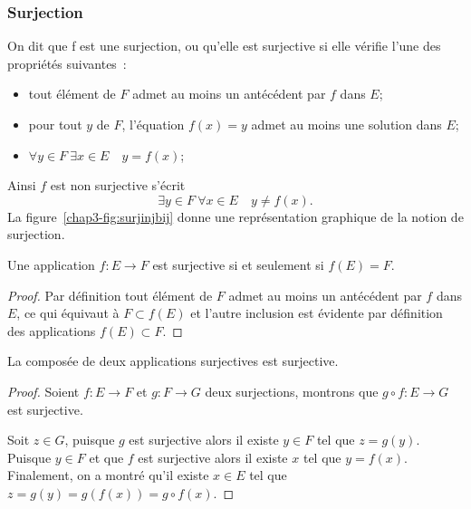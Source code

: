 \subsubsection{Surjection}
\label{chap3-subsubsec:surjection}
\begin{defdef}
  On dit que f est une surjection, ou qu'elle est surjective si elle vérifie l'une des propriétés suivantes~:
  \begin{itemize}
  \item tout élément de $F$ admet au moins un antécédent par $f$ dans $E$;
  \item pour tout $y$ de $F$, l'équation $f(x)=y$ admet au moins une solution dans $E$;
  \item $\forall y \in F \ \exists x \in E \quad y=f(x)$;
  \end{itemize}
  Ainsi $f$ est non surjective s'écrit
  \begin{equation}
    \exists y \in F \ \forall x \in E \quad y \neq f(x).
  \end{equation}
  La figure~\ref{chap3-fig:surjinjbij} donne une représentation graphique de la notion de surjection.
\end{defdef}
\begin{prop}
  Une application $f:E \longrightarrow F$ est surjective si et seulement si $f(E)=F$.
\end{prop}
\begin{proof}
    Par définition tout élément de $F$ admet au moins un antécédent par $f$ dans $E$, ce qui équivaut à $F \subset f(E)$ et l'autre inclusion est évidente par définition des applications $f(E) \subset F$.
\end{proof}
\begin{theo}
  La composée de deux applications surjectives est surjective.
\end{theo}
\begin{proof}
  Soient $f:E \longrightarrow F$ et $g:F \longrightarrow G$ deux surjections, montrons que $g \circ f: E \longrightarrow G$ est surjective. 

  Soit $z \in G$, puisque $g$ est surjective alors il existe $y \in F$ tel que $z=g(y)$. Puisque $y \in F$ et que $f$ est surjective alors il existe $x$ tel que $y=f(x)$. Finalement, on a montré qu'il existe $x \in E$ tel que $z=g(y)=g(f(x))= g \circ f(x)$.
\end{proof}
%
